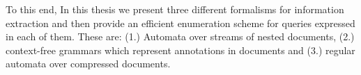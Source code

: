 %
%
%
%

To this end, In this thesis we present three different formalisms for information extraction and then provide an efficient enumeration scheme for queries expressed in each of them. 
These are: (1.) Automata over streams of nested documents, (2.) context-free grammars which represent annotations in documents and (3.) regular automata over compressed documents. 





